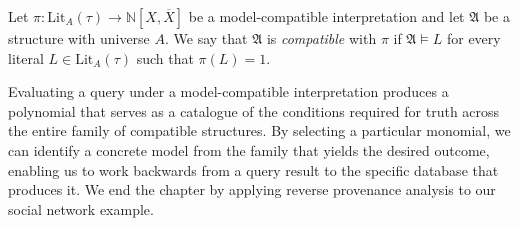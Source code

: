 \documentclass[oneside, 11pt]{amsbook}
\theoremstyle{plain}
\theoremstyle{definition}
\theoremstyle{remark}
\begin{document}
\begin{defn}[Compatible]
    Let $\pi \colon \mathrm{Lit}_A(\tau) \to \mathbb{N}[X, \overline{X}]$ be a model-compatible interpretation and let $\mathfrak{A}$ be a structure with universe $A$. We say that $\mathfrak{A}$ is \emph{compatible} with $\pi$ if $\mathfrak{A} \models L$ for every literal $L \in \mathrm{Lit}_A(\tau)$ such that $\pi(L) = 1$.
\end{defn}

Evaluating a query under a model-compatible interpretation produces a polynomial that serves as a catalogue of the conditions required for truth across the entire family of compatible structures. By selecting a particular monomial, we can identify a concrete model from the family that yields the desired outcome, enabling us to work backwards from a query result to the specific database that produces it. We end the chapter by applying reverse provenance analysis to our social network example.
\end{document}
